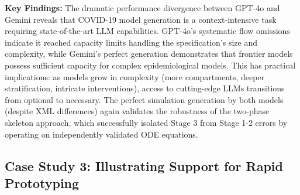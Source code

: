 \textbf{Key Findings:} The dramatic performance divergence between GPT-4o and Gemini reveals that COVID-19 model generation is a context-intensive task requiring state-of-the-art LLM capabilities. GPT-4o's systematic flow omissions indicate it reached capacity limits handling the specification's size and complexity, while Gemini's perfect generation demonstrates that frontier models possess sufficient capacity for complex epidemiological models. This has practical implications: as models grow in complexity (more compartments, deeper stratification, intricate interventions), access to cutting-edge LLMs transitions from optional to necessary. The perfect simulation generation by both models (despite XML differences) again validates the robustness of the two-phase skeleton approach, which successfully isolated Stage 3 from Stage 1-2 errors by operating on independently validated ODE equations.



\subsection{Case Study 3: Illustrating Support for Rapid Prototyping}
\label{sec:casestudy:prototyping}



